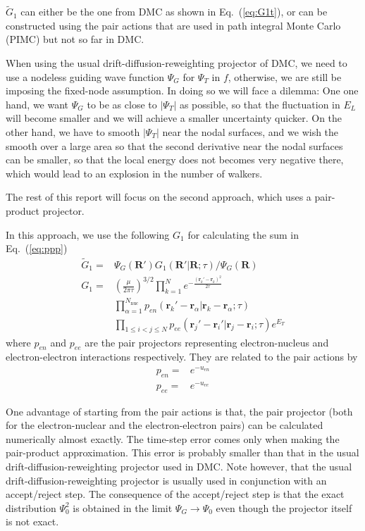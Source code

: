 \documentclass[%
reprint,
nofootinbib,
amsmath,amssymb,
aps,
prl,
]{revtex4-1}
\begin{document}
$\widetilde{G}_1$ can either be the one from DMC as shown in Eq.~(\ref{eq:G1t}), or can be constructed using the pair actions that are used in path integral Monte Carlo (PIMC) but not so far in DMC.

When using the usual drift-diffusion-reweighting projector of DMC, we need to use a nodeless guiding wave function $\Psi_G$ for $\Psi_T$ in $f$, otherwise, we are still be imposing the fixed-node assumption.
In doing so we will face a dilemma:
One one hand, we want $\Psi_G$ to be as close to $|\Psi_T|$ as possible, so that the fluctuation in $E_L$ will become smaller and we will achieve a smaller uncertainty quicker.
On the other hand, we have to smooth $|\Psi_T|$ near the nodal surfaces, and we wish the smooth over a large area so that the second derivative near the nodal surfaces can be smaller, so that the local energy does not becomes very negative there, which would lead to an explosion in the number of walkers.

The rest of this report will focus on the second approach, which uses a pair-product projector.

In this approach, we use the following $G_1$ for calculating the sum in Eq.~(\ref{eq:ppp}) \cite{umrigar2015observations}
\begin{align}
\label{eq:G1ppp}
\widetilde{G}_1 = & \Psi_G(\bm{R'})G_1(\bm{R'}|\bm{R};\tau)/\Psi_G(\bm{R})\\
G_1 = & \left(\frac{\mu}{2\pi\tau}\right)^{3/2}
\prod\limits_{k=1}^{N}e^{-\frac{(\bm{r}_k'-\bm{r}_k)^2}{2\tau}}\nonumber\\
 & \prod\limits_{\alpha = 1}^{N_{\mathrm{nuc}}}
p_{en}(\bm{r}_k'-\bm{r}_\alpha|\bm{r}_k-\bm{r}_\alpha;\tau)\nonumber\\
 & \prod\limits_{1\leq i < j \leq N}p_{ee}(\bm{r}_j'-\bm{r}_i'|\bm{r}_j-\bm{r}_i;\tau)
e^{E_T}
\end{align}
where $p_{en}$ and $p_{ee}$ are the pair projectors representing electron-nucleus and electron-electron interactions respectively.
They are related to the pair actions by
\begin{align}
p_{en} = & e^{-u_{en}}\\
p_{ee} = & e^{-u_{ee}}
\end{align}

One advantage of starting from the pair actions is that, the pair projector (both for the electron-nuclear and the electron-electron pairs) can be calculated numerically almost exactly.  The time-step error comes only when making the pair-product approximation.  This error is probably smaller than that in the usual drift-diffusion-reweighting projector used in DMC.
Note however, that the usual drift-diffusion-reweighting projector is usually used in conjunction with an accept/reject
step.  The consequence of the accept/reject step is that the exact distribution $\Psi_0^2$ is obtained in
the limit $\Psi_G \to \Psi_0$ even though the projector itself is not exact.
\end{document}
